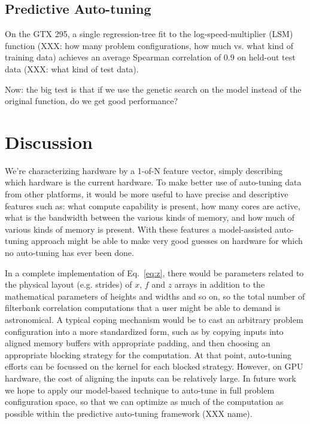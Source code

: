 \documentclass{sig-alternate}
\begin{document}
\subsection{Predictive Auto-tuning}

On the GTX 295, a single regression-tree fit to the log-speed-multiplier
(LSM) function (XXX: how many problem configurations, how much vs. what
kind of training data) achieves an average Spearman correlation of 0.9 on
held-out test data (XXX: what kind of test data).

Now: the big test is that if we use the genetic search on the model instead of
the original function, do we get good performance?

\section{Discussion}

We're characterizing hardware by a 1-of-N feature vector, simply describing
which hardware is the current hardware.
To make better use of auto-tuning data from other platforms, it would be more
useful to have precise and descriptive features such as: what compute
capability is present, how many cores are active, what is the bandwidth
between the various kinds of memory, and how much of various kinds of memory
is present.  With these features a model-assisted auto-tuning approach
might be able to make very good guesses on hardware for which no auto-tuning
has ever been done.

In a complete implementation of Eq.~\ref{eq:z}, there would be parameters
related to the physical layout (e.g. strides) of $x$, $f$ and $z$ arrays in
addition to the mathematical parameters of heights and widths and so on,
so the total number of filterbank correlation computations that a user might
be able to demand is astronomical.
A typical coping mechanism would be to cast an arbitrary problem configuration into a more
standardized form, such as by copying inputs into aligned memory buffers with
appropriate padding, and then choosing an appropriate blocking strategy for
the computation. At that point, auto-tuning efforts can be focussed on the
kernel for each blocked strategy. However, on GPU hardware, the cost of
aligning the inputs can be relatively large.  In future work we hope to apply
our model-based technique to auto-tune in full problem configuration space, so
that we can optimize as much of the computation as possible within the
predictive auto-tuning framework (XXX name).
\end{document}
